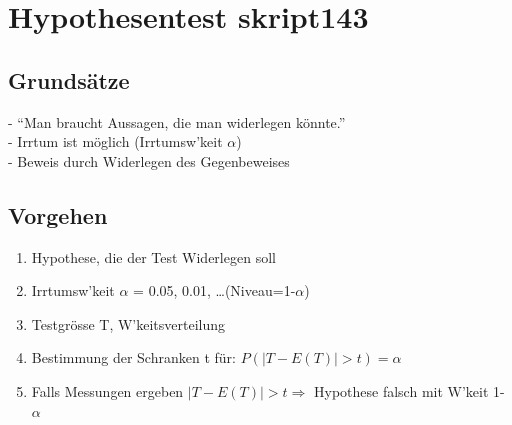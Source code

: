\newpage
\section{Hypothesentest skript{143} }
	\subsection{Grundsätze}
	- ``Man braucht Aussagen, die man widerlegen könnte.''\\
	- Irrtum ist möglich (Irrtumsw'keit $\alpha$)\\
	- Beweis durch Widerlegen des Gegenbeweises
	\subsection{Vorgehen}
	\begin{enumerate}
      \item Hypothese, die der Test Widerlegen soll
      \item Irrtumsw'keit $\alpha$ = 0.05, 0.01, \ldots (Niveau=1-$\alpha$)
      \item Testgrösse T, W'keitsverteilung
      \item Bestimmung der Schranken t für: $P(|T-E(T)|>t)=\alpha$
      \item Falls Messungen ergeben $|T-E(T)|>t \Longrightarrow$ Hypothese
      falsch mit W'keit 1- $\alpha$
    \end{enumerate}
    
    
